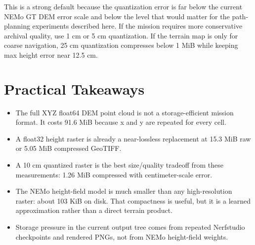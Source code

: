 \documentclass[10pt]{article}
\begin{document}
This is a strong default because the quantization error is far below the current NEMo GT DEM error scale and below the level that would matter for the path-planning experiments described here. If the mission requires more conservative archival quality, use 1 cm or 5 cm quantization. If the terrain map is only for coarse navigation, 25 cm quantization compresses below 1 MiB while keeping max height error near 12.5 cm.

\section{Practical Takeaways}

\begin{itemize}[leftmargin=*]
  \item The full XYZ float64 DEM point cloud is not a storage-efficient mission format. It costs 91.6 MiB because x and y are repeated for every cell.
  \item A float32 height raster is already a near-lossless replacement at 15.3 MiB raw or 5.05 MiB compressed GeoTIFF.
  \item A 10 cm quantized raster is the best size/quality tradeoff from these measurements: 1.26 MiB compressed with centimeter-scale error.
  \item The NEMo height-field model is much smaller than any high-resolution raster: about 103 KiB on disk. That compactness is useful, but it is a learned approximation rather than a direct terrain product.
  \item Storage pressure in the current output tree comes from repeated Nerfstudio checkpoints and rendered PNGs, not from NEMo height-field weights.
\end{itemize}
\end{document}
